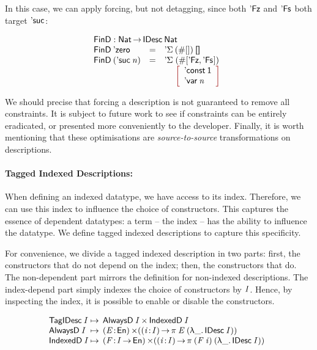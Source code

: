 In this case, we can apply forcing, but not detagging, since both
$\FinZero$ and $\FinSuc{\!}$ both target $\NatSuc{\!}$:

\[\stk{
\FinD : \Nat \To \IDesc{\Nat} \\
\begin{array}{@{}llll}
\FinD\: \NatZero     & = & \multicolumn{2}{l}{\DSigma{(\EnumT{[]})}{\Void} } \\
\FinD\: (\NatSuc{\V{n}}) & = & \DSigma{\!}{\!}\!\!\!\!\! & (\EnumT{[ \FinZero , \FinSuc{\!} ]}) \\
                     &   &             & \bigRedBracket{
                                         \begin{array}{l}
                                         \DConst{\Unit} \\
                                         \DVar{\V{n}}
                                         \end{array}
                                         }
\end{array}
}\]

We should precise that forcing a description is not guaranteed to
remove all constraints. It is subject to future work to see if
constraints can be entirely eradicated, or presented more conveniently
to the developer.  Finally, it is worth mentioning that these
optimisations are \emph{source-to-source} transformations on
descriptions.

\paragraph{Tagged Indexed Descriptions:}

When defining an indexed datatype, we have access to its
index. Therefore, we can use this index to influence the choice of
constructors. This captures the essence of dependent datatypes: a
term -- the index -- has the ability to influence the datatype. We
define tagged indexed descriptions to capture this specificity.

For convenience, we divide a tagged indexed description in two parts:
first, the constructors that do not depend on the index; then, the
constructors that do. The non-dependent part mirrors the definition
for non-indexed descriptions. The index-depend part simply indexes the
choice of constructors by $\V{I}$. Hence, by inspecting the index, it
is possible to enable or disable the constructors.

\[
\begin{array}{@{}l@{\:\mapsto\:\:}l}
 \TagIDesc{\V{I}}  & \TIMES{\ATagIDesc{\V{I}}}{\ITagIDesc{\V{I}}} \\
 \ATagIDesc{\V{I}} & \SIGMA{\V{E}}{\EnumU} (\PI{\V{i}}{\V{I}} \spi{\V{E}}{(\LAM{\_} \IDesc{\V{I}})}) \\
 \ITagIDesc{\V{I}} & 
     \SIGMA{\V{F}}{\V{I} \To \EnumU} (\PI{\V{i}}{\V{I}} \spi{(\V{F}\: \V{i})}{(\LAM{\_} \IDesc{\V{I}})}) 
\end{array}
\]

